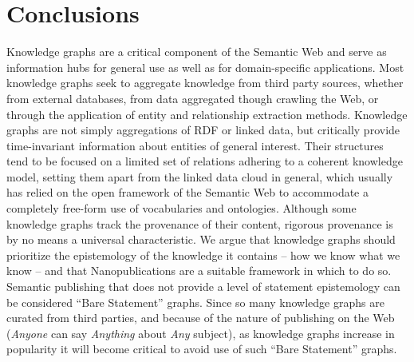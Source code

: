 \section{Conclusions}

Knowledge graphs are a critical component of the Semantic Web and serve as information hubs for general use as well as for domain-specific applications.
Most knowledge graphs seek to aggregate knowledge from third party sources, whether from external databases, from data aggregated though crawling the Web, or through the application of entity and relationship extraction methods.
Knowledge graphs are not simply aggregations of RDF or linked data, but critically provide time-invariant information about entities of general interest.
Their structures tend to be focused on a limited set of relations adhering to a coherent knowledge model, setting them apart from the linked data cloud in general, which usually has relied on the open framework of the Semantic Web to accommodate a completely free-form use of vocabularies and ontologies.
Although some knowledge graphs track the provenance of their content, rigorous provenance is by no means a universal characteristic.
We argue that knowledge graphs should prioritize the epistemology of the knowledge it contains -- how we know what we know -- and that Nanopublications are a suitable framework in which to do so.
Semantic publishing that does not provide a level of statement epistemology can be considered ``Bare Statement'' graphs.
Since so many knowledge graphs are curated from third parties, and because of the nature of publishing on the Web (\textit{Anyone} can say \textit{Anything} about \textit{Any} subject), as knowledge graphs increase in popularity it will become critical to avoid use of such ``Bare Statement'' graphs.